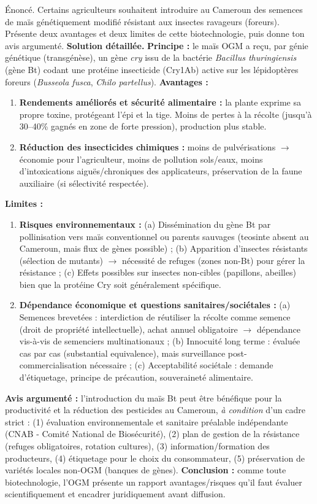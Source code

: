 \documentclass[11pt]{article}
\newcommand{\cle}[1]{{\popxbold\color{popdark}#1}}
\begin{document}
\begin{exoresolu}
Énoncé. Certains agriculteurs souhaitent introduire au Cameroun des semences de maïs génétiquement modifié résistant aux insectes ravageurs (foreurs). Présente deux avantages et deux limites de cette biotechnologie, puis donne ton avis argumenté.
\tcblower
\textbf{Solution détaillée.}
\textbf{Principe :} le maïs OGM a reçu, par génie génétique (transgénèse), un gène \emph{cry} issu de la bactérie \emph{Bacillus thuringiensis} (gène Bt) codant une protéine insecticide (Cry1Ab) active sur les lépidoptères foreurs (\emph{Busseola fusca}, \emph{Chilo partellus}).
\textbf{Avantages :}
\begin{enumerate}
\item \textbf{Rendements améliorés et sécurité alimentaire :} la plante exprime sa propre toxine, protégeant l'épi et la tige. Moins de pertes à la récolte (jusqu'à 30--40\% gagnés en zone de forte pression), production plus stable.
\item \textbf{Réduction des insecticides chimiques :} moins de pulvérisations $\rightarrow$ économie pour l'agriculteur, moins de pollution sols/eaux, moins d'intoxications aiguës/chroniques des applicateurs, préservation de la faune auxiliaire (si sélectivité respectée).
\end{enumerate}
\textbf{Limites :}
\begin{enumerate}
\item \textbf{Risques environnementaux :} (a) Dissémination du gène Bt par pollinisation vers maïs conventionnel ou parents sauvages (teosinte absent au Cameroun, mais flux de gènes possible) ; (b) Apparition d'insectes résistants (sélection de mutants) $\rightarrow$ nécessité de \cle{refuges} (zones non-Bt) pour gérer la résistance ; (c) Effets possibles sur insectes non-cibles (papillons, abeilles) bien que la protéine Cry soit généralement spécifique.
\item \textbf{Dépendance économique et questions sanitaires/sociétales :} (a) Semences brevetées : interdiction de réutiliser la récolte comme semence (droit de propriété intellectuelle), achat annuel obligatoire $\rightarrow$ dépendance vis-à-vis de semenciers multinationaux ; (b) Innocuité long terme : évaluée cas par cas (substantial equivalence), mais surveillance post-commercialisation nécessaire ; (c) Acceptabilité sociétale : demande d'étiquetage, principe de précaution, souveraineté alimentaire.
\end{enumerate}
\textbf{Avis argumenté :} l'introduction du maïs Bt peut être bénéfique pour la productivité et la réduction des pesticides au Cameroun, \emph{à condition} d'un cadre strict : (1) évaluation environnementale et sanitaire préalable indépendante (CNAB - Comité National de Biosécurité), (2) plan de gestion de la résistance (refuges obligatoires, rotation cultures), (3) information/formation des producteurs, (4) étiquetage pour le choix du consommateur, (5) préservation de variétés locales non-OGM (banques de gènes).
\textbf{Conclusion :} comme toute biotechnologie, l'OGM présente un rapport avantages/risques qu'il faut évaluer scientifiquement et encadrer juridiquement avant diffusion.
\end{exoresolu}
\end{document}
